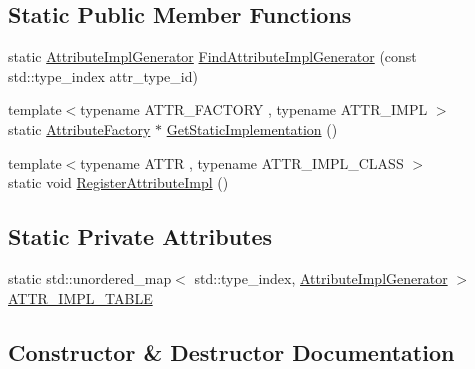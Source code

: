 \subsection*{Static Public Member Functions}
\begin{DoxyCompactItemize}
\item 
static \mbox{\hyperlink{namespacelucene_1_1core_1_1util_acbd8821be7d7b29749374e57b0a7c40b}{Attribute\+Impl\+Generator}} \mbox{\hyperlink{classlucene_1_1core_1_1util_1_1AttributeFactory_af56838e41c83a10b00063e02c3f910e6}{Find\+Attribute\+Impl\+Generator}} (const std\+::type\+\_\+index attr\+\_\+type\+\_\+id)
\item 
{\footnotesize template$<$typename A\+T\+T\+R\+\_\+\+F\+A\+C\+T\+O\+RY , typename A\+T\+T\+R\+\_\+\+I\+M\+PL $>$ }\\static \mbox{\hyperlink{classlucene_1_1core_1_1util_1_1AttributeFactory}{Attribute\+Factory}} $\ast$ \mbox{\hyperlink{classlucene_1_1core_1_1util_1_1AttributeFactory_ac770bcd808b70e6d1d5f8a3c6cd8150d}{Get\+Static\+Implementation}} ()
\item 
{\footnotesize template$<$typename A\+T\+TR , typename A\+T\+T\+R\+\_\+\+I\+M\+P\+L\+\_\+\+C\+L\+A\+SS $>$ }\\static void \mbox{\hyperlink{classlucene_1_1core_1_1util_1_1AttributeFactory_a57d5469dd678591652d59bf3db4890e1}{Register\+Attribute\+Impl}} ()
\end{DoxyCompactItemize}
\subsection*{Static Private Attributes}
\begin{DoxyCompactItemize}
\item 
static std\+::unordered\+\_\+map$<$ std\+::type\+\_\+index, \mbox{\hyperlink{namespacelucene_1_1core_1_1util_acbd8821be7d7b29749374e57b0a7c40b}{Attribute\+Impl\+Generator}} $>$ \mbox{\hyperlink{classlucene_1_1core_1_1util_1_1AttributeFactory_a5247e47d95ce30862a15e66ce2266d04}{A\+T\+T\+R\+\_\+\+I\+M\+P\+L\+\_\+\+T\+A\+B\+LE}}
\end{DoxyCompactItemize}


\subsection{Constructor \& Destructor Documentation}
\mbox{\label{classlucene_1_1core_1_1util_1_1AttributeFactory_a55d388271f308e3105344163e56dddc4}} 
